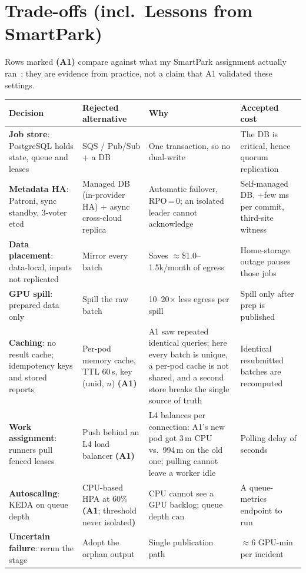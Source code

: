 \documentclass[10pt,a4paper]{article}
\begin{document}
\section{Trade-offs (incl.\ Lessons from SmartPark)}
Rows marked \textbf{(A1)} compare against what my SmartPark assignment actually ran~\cite{smartpark}; they are
evidence from practice, not a claim that A1 validated these settings.
\begin{table}[H]\centering\footnotesize
{}
\begin{tabularx}{\linewidth}{@{}L{3.75cm}L{3.15cm}YL{2.75cm}@{}}
\toprule
\textbf{Decision} & \textbf{Rejected alternative} & \textbf{Why} & \textbf{Accepted cost} \\ \midrule
\textbf{Job store}: PostgreSQL holds state, queue and leases & SQS / Pub/Sub + a DB & One transaction, so no dual-write & The DB is critical, hence quorum replication \\
\textbf{Metadata HA}: Patroni, sync standby, 3-voter etcd & Managed DB (in-provider HA) + async cross-cloud replica & Automatic failover, RPO\,=\,0; an isolated leader cannot acknowledge & Self-managed DB, +few ms per commit, third-site witness \\
\textbf{Data placement}: data-local, inputs not replicated & Mirror every batch & Saves $\approx$\$1.0--1.5k/month of egress & Home-storage outage pauses those jobs \\
\textbf{GPU spill}: prepared data only & Spill the raw batch & 10--20$\times$ less egress per spill & Spill only after prep is published \\
\textbf{Caching}: no result cache; idempotency keys and stored reports & Per-pod memory cache, TTL 60\,s, key (uuid, $n$) \textbf{(A1)} & A1 saw repeated identical queries; here every batch is unique, a per-pod cache is not shared, and a second store breaks the single source of truth & Identical resubmitted batches are recomputed \\
\textbf{Work assignment}: runners pull fenced leases & Push behind an L4 load balancer \textbf{(A1)} & L4 balances per connection: A1's new pod got 3\,m CPU vs.\ 994\,m on the old one; pulling cannot leave a worker idle & Polling delay of seconds \\
\textbf{Autoscaling}: KEDA on queue depth & CPU-based HPA at 60\% \textbf{(A1}; threshold never isolated\textbf{)} & CPU cannot see a GPU backlog; queue depth can & A queue-metrics endpoint to run \\
\textbf{Uncertain failure}: rerun the stage & Adopt the orphan output & Single publication path & $\approx$6 GPU-min per incident \\

\end{tabularx}
\end{table}
\end{document}
